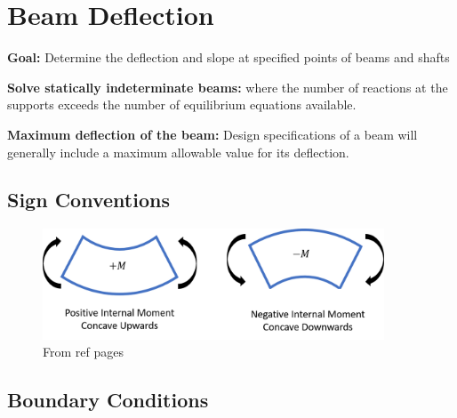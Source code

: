 \section{Beam Deflection}

\textbf{Goal:} Determine the deflection and slope at specified points of beams and shafts

\vspace{5pt}

\noindent \textbf{Solve statically indeterminate beams:} where the number of reactions at the supports exceeds the number of equilibrium equations available.

\vspace{5pt}

\noindent \textbf{Maximum deflection of the beam:} Design specifications of a beam will generally include a maximum allowable value for its deflection.

\vspace{5pt}

\subsection{Sign Conventions}

\begin{figure}[!h]
\centering
\includegraphics[angle=0, width=4in]{Beam Deflection-Figures/signConvention1.png}
\vspace{-2mm}
\caption{\small From ref pages}
\vspace{-3mm}
\label{Fig:Signs}
\end{figure}

\subsection{Boundary Conditions}

